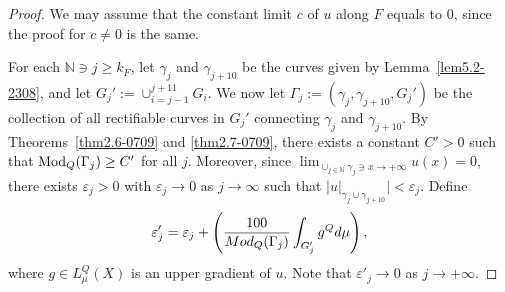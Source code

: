 \documentclass[10pt]{amsart}
\numberwithin{equation}{section}
\begin{document}
 \begin{proof} 
 We may assume that the constant limit $c$ of $u$ along $F$ equals to 0, since the proof for $c\neq 0$ is the same.  

For each $\mathbb{N}\ni j\geq k_F$, let $\gamma_j$ and $\gamma_{j+10}$ be the curves given by Lemma~\ref{lem5.2-2308}, and let $G_j':=\cup_{i={j-1}}^{j+11}G_i$. We now let $\Gamma_j:=(\gamma_j,\gamma_{j+10}, G_j')$ be the collection of all rectifiable curves in $G_j'$ connecting $\gamma_j$ and $\gamma_{j+10}$.  By Theorems~\ref{thm2.6-0709} and \ref{thm2.7-0709},  there exists a constant $C'>0$ such that $\text{\rm Mod}_Q{(\Gamma_j)}\ge C'$ for all $j$.  Moreover, since $\lim_{\cup_{j\in\mathbb N}\gamma_j\ni x\to+\infty}u(x)=0$, there exists $\varepsilon_j>0$ with $\varepsilon_j\to 0$ as $j\to\infty$ such that $|u|_{\gamma_j\cup\gamma_{j+10}}|<\varepsilon_j$.  Define
\begin{equation}\notag\label{eq5.5-2308}
	\varepsilon'_j= \varepsilon_j+ \left(\frac{100}{{\rm Mod}_Q(\Gamma_j)} \int_{G_j'}g^Qd\mu \right),
\end{equation}
where $g\in L^Q_\mu(X)$ is an upper gradient of $u$.  Note that $\varepsilon'_j\to 0$ as $j\to+\infty$.



\end{proof}
\end{document}
